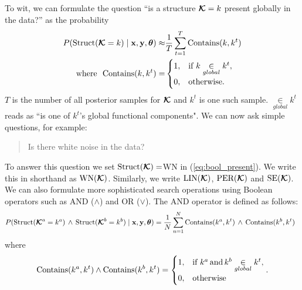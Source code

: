 To wit, we can formulate the question ``is a structure $\bm{\mathcal{K}}=k$ present globally in
the data?'' as the probability
\begin{align}
\label{eq:bool_present}
P(\text{Struct}(\bm{\mathcal{K}}=k) \mid \mathbf{x},\mathbf{y},\bm{\theta}) \approx & \frac{1}{T}
\sum\limits_{t=1}^T \text{Contains}(k,k^t)\\
\text{where}\ \ \text{Contains}(k,k^t) = & \begin{cases}
  1, & \text{if } k \underset{global}{\in} k^t, \\
  0, & \text{otherwise}.
\end{cases} 
\end{align}
$T$ is the number of all posterior samples for $\bm{\mathcal{K}}$ and $k^t$ is one such
sample. $\underset{global}{\in} k^t$ reads as ``is one of $k^t$'s global
functional components".
We can now ask simple questions, for example:
\begin{quotation}
Is there white noise in the data?
\end{quotation}
To answer this question we set $\text{Struct}(\bm{\mathcal{K}}) = $WN in (\ref{eq:bool_present}). We write this in
shorthand as $\text{WN}(\bm{\mathcal{K}})$. Similarly, we write $\text{LIN}(\bm{\mathcal{K}})$, $\text{PER}(\bm{\mathcal{K}})$ and $\text{SE}(\bm{\mathcal{K}})$. 
We can also formulate more sophisticated search operations using Boolean operators such as AND ($\land$) and OR ($\lor$).
The AND operator is defined as follows:
\[
P(\text{Struct}(\bm{\mathcal{K}}^a=k^a)\, \land\, \text{Struct}(\bm{\mathcal{K}}^b=k^b) \mid \mathbf{x},\mathbf{y}, \bm{\theta})  = \frac{1}{N}
\sum\limits_{n=1}^N \text{Contains}(k^a,k^t)\, \land \, \text{Contains}(k^b,k^t)\;\;
\]
where
\[
\text{Contains}(k^a,k^t) \land \text{Contains}(k^b,k^t) = \begin{cases}
  1, & \text{if } k^a\, \text{and}\, k^b  \underset{global}{\in} k^t, \\
  0, & \text{otherwise}\end{cases}.
\]


